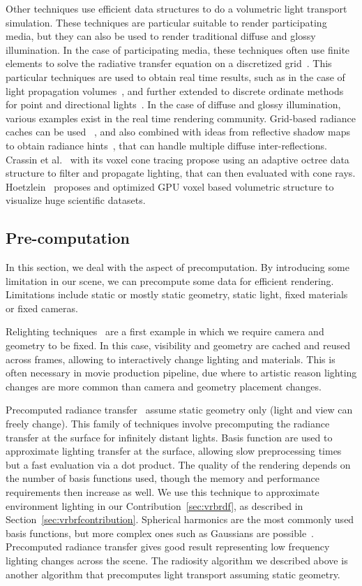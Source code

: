 Other techniques use efficient data structures to do a volumetric light transport simulation. These techniques are particular suitable to render participating media, but they can also be used to render traditional diffuse and glossy illumination. In the case of participating media, these techniques often use finite elements to solve the radiative transfer equation on a discretized grid~\cite{Fattal2009}. This particular techniques are used to obtain real time results, such as in the case of light propagation volumes~\cite{Kaplanyan2009,Borlum2011}, and further extended to discrete ordinate methods for point and directional lights~\cite{Elek2014}. In the case of diffuse and glossy illumination, various examples exist in the real time rendering community. Grid-based radiance caches can be used ~\cite{Nijasure2005}, and also combined with ideas from reflective shadow maps to obtain radiance hints~\cite{Papaioannou2011, Vardis2014}, that can handle multiple diffuse inter-reflections.  Crassin et al.~\cite{Crassin2011} with its voxel cone tracing propose using an adaptive octree data structure to filter and propagate lighting, that can then evaluated with cone rays. Hoetzlein~\cite{Hoetzlein2016} proposes and optimized GPU voxel based volumetric structure to visualize huge scientific datasets. 

\subsection{Pre-computation}
In this section, we deal with the aspect of precomputation. By introducing some limitation in our scene, we can precompute some data for efficient rendering. Limitations include static or mostly static geometry, static light, fixed materials or fixed cameras. 

Relighting techniques~\cite{Nimeroff94, Pellacini2005, Hasan2006} are a first example in which we require camera and geometry to be fixed. In this case, visibility and geometry are cached and reused across frames, allowing to interactively change lighting and materials. This is often necessary in movie production pipeline, due where to artistic reason lighting changes are more common than camera and geometry placement changes.

Precomputed radiance transfer~\cite{Sloan2002} assume static geometry only (light and view can freely change). This family of techniques involve precomputing the radiance transfer at the surface for infinitely distant lights. Basis function are used to approximate lighting transfer at the surface, allowing slow preprocessing times but a fast evaluation via a dot product. The quality of the rendering depends on the number of basis functions used, though the memory and performance requirements then increase as well. We use this technique to approximate environment lighting in our Contribution~\ref{sec:vrbrdf}, as described in Section~\ref{sec:vrbrfcontribution}. Spherical harmonics are the most commonly used basis functions, but more complex ones such as Gaussians are possible~\cite{Green2006}. Precomputed radiance transfer gives good result representing low frequency lighting changes across the scene. The radiosity algorithm we described above is another algorithm that precomputes light transport assuming static geometry.

